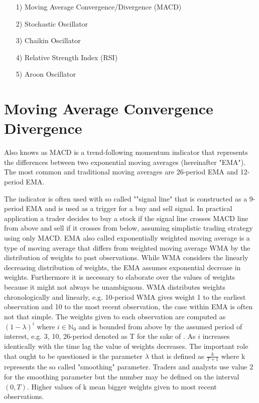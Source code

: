\begin{itemize}
\item[1)] Moving Average Convergence/Divergence (MACD)
\item[2)] Stochastic Oscillator
\item[3)] Chaikin Oscillator 
\item[4)] Relative Strength Index (RSI)
\item[5)] Aroon Oscillator 
\end{itemize}


\section{Moving Average Convergence Divergence}

Also knows as MACD is a trend-following momentum indicator that represents the differences between two exponential moving averages (hereinafter "EMA"). The most common and traditional moving averages are 26-period EMA and 12-period EMA. 

The indicator is often used with so called ""signal line" that is constructed as a 9-period EMA and is used as a trigger for a buy and sell signal. In practical application a trader decides to buy a stock if the signal line crosses MACD line from above and sell if it crosses from below, assuming simplistic trading strategy using only MACD. EMA also called exponentially weighted moving average is a type of moving average that differs from weighted moving average WMA by the distribution of weights to past observations. While WMA considers the linearly decreasing distribution of weights, the EMA assumes exponential decrease in weights. Furthermore it is necessary to elaborate over the values of weights because it might not always be unambiguous. WMA distributes weights chronologically and linearly, e.g. 10-period WMA gives weight 1 to the earliest observation and 10 to the most recent observation, the case within EMA is often not that simple. The weights given to each observation are computed as $(1 - \lambda)^i$ where $i \in \mathbb{N}_0$ and is bounded from above by the assumed period of interest, e.g. 3, 10, 26-period denoted as T for the sake of . As $i$ increases identically with the time lag the value of weights decreases. The important role that ought to be questioned is the parameter $\lambda$ that is defined as $\frac{k}{T+1}$ where k represents the so called "smoothing" parameter. Traders and analysts use value 2 for the smoothing parameter but the number may be defined on the interval $(0,T)$. Higher values of k mean bigger weights given to most recent observations. 

